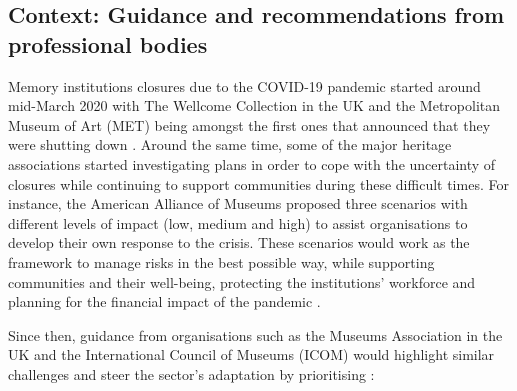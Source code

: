 \documentclass{egpubl}
\begin{document}
\subsection{Context: Guidance and recommendations from professional bodies}
\label{con}
Memory institutions closures due to the COVID-19 pandemic started around mid-March 2020 with The Wellcome Collection in the UK and the Metropolitan Museum of Art (MET) being amongst the first ones that announced that they were shutting down \cite{McGivern2020,KendallAdams2020}. Around the same time, some of the major heritage  associations started investigating plans in order to cope with the uncertainty of closures while continuing to support communities during these difficult times. For instance, the American Alliance of Museums proposed three scenarios with different levels of impact (low, medium and high) to assist organisations to develop their own response to the crisis. These scenarios would work as the framework to manage risks in the best possible way, while supporting communities and their well-being, protecting the institutions' workforce and planning for the financial impact of the pandemic \cite{Merritt2020}.

Since then, guidance from organisations such as the Museums Association in the UK and the International Council of Museums (ICOM) would highlight similar challenges and steer the sector's adaptation by prioritising \cite{InternationalCouncilofMuseums2020a,Olorunshola2020,MuseumsAssociation2020}:
 
\end{document}
